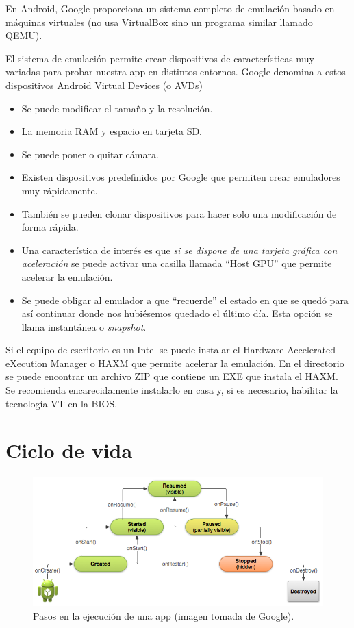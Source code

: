 \documentclass[a4paper,12pt,spanish]{sphinxmanual}
\begin{document}
En Android, Google proporciona un sistema completo de emulación basado en máquinas virtuales (no usa VirtualBox sino un programa similar llamado QEMU).

El sistema de emulación permite crear dispositivos de características muy variadas para probar nuestra app en distintos entornos. Google denomina a estos dispositivos Android Virtual Devices (o AVDs)
\begin{itemize}
\item {} 
Se puede modificar el tamaño y la resolución.

\item {} 
La memoria RAM y espacio en tarjeta SD.

\item {} 
Se puede poner o quitar cámara.

\item {} 
Existen dispositivos predefinidos por Google que permiten crear emuladores muy rápidamente.

\item {} 
También se pueden clonar dispositivos para hacer solo una modificación de forma rápida.

\item {} 
Una característica de interés es que \emph{si se dispone de una tarjeta gráfica con aceleración} se puede activar una casilla llamada ``Host GPU'' que permite acelerar la emulación.

\item {} 
Se puede obligar al emulador a que ``recuerde'' el estado en que se quedó para así continuar donde nos hubiésemos quedado el último día. Esta opción se llama instantánea o \emph{snapshot}.

\end{itemize}

Si el equipo de escritorio es un Intel se puede instalar el Hardware Accelerated eXecution Manager o HAXM que permite acelerar la emulación. En el directorio  se puede encontrar un archivo ZIP que contiene un EXE que instala el HAXM. Se recomienda encarecidamente instalarlo en casa y, si es necesario, habilitar la tecnología VT en la BIOS.


\section{Ciclo de vida}
\label{tema1:ciclo-de-vida}\begin{figure}[htbp]
\centering
\capstart

\includegraphics{ciclodevida.png}
\caption{Pasos en la ejecución de una app (imagen tomada de Google).}\end{figure}
\end{document}
